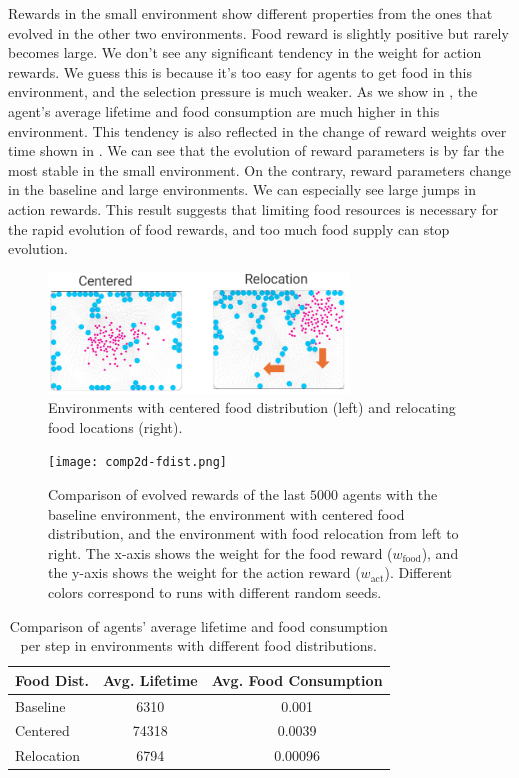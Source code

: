 Rewards in the small environment show different properties from the ones that evolved in the other two environments. Food reward is slightly positive but rarely becomes large. We don't see any significant tendency in the weight for action rewards. We guess this is because it's too easy for agents to get food in this environment, and the selection pressure is much weaker. As we show in , the agent's average lifetime and food consumption are much higher in this environment. This tendency is also reflected in the change of reward weights over time shown in . We can see that the evolution of reward parameters is by far the most stable in the small environment. On the contrary, reward parameters change in the baseline and large environments. We can especially see large jumps in action rewards. This result suggests that limiting food resources is necessary for the rapid evolution of food rewards, and too much food supply can stop evolution.

\begin{figure}[t]
  \centering
  \includegraphics[width=8cm]{resources/centered-and-reloc.png}
  \caption{
    Environments with centered food distribution (left) and relocating food locations (right).
  }\label{figure:env-fdist}
\end{figure}

\begin{figure}[t]
  \centering
  \texttt{[image: comp2d-fdist.png]}
  \caption{
    Comparison of evolved rewards of the last $5000$ agents with the baseline environment, the environment with centered food distribution, and the environment with food relocation from left to right.
    The x-axis shows the weight for the food reward ($w_{\mathrm{food}}$), and the y-axis shows the weight for the action reward ($w_{\mathrm{act}}$).
    Different colors correspond to runs with different random seeds.
  }\label{figure:result-fdist}
\end{figure}

\begin{table}[t]
    \centering
    \begin{tabular}{lcc}
      \toprule
      Food Dist. &  Avg. Lifetime & Avg. Food Consumption \\
      \midrule
      Baseline & 6310 & 0.001 \\
      Centered &  74318 & 0.0039 \\
      Relocation & 6794 & 0.00096 \\
      \bottomrule
    \end{tabular}
  \caption{
    Comparison of agents' average lifetime and food consumption per step in environments with different food distributions.
  }\label{table:fdist}
\end{table}

